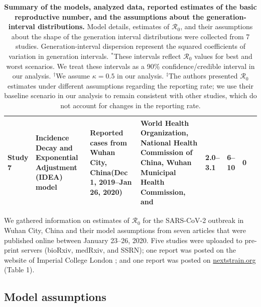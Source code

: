 \documentclass[12pt]{article}
\newcommand{\Ro}{\ensuremath{{\mathcal R}_{0}}\xspace}
\providecommand{\DIFaddend}{} %
\DeclareRobustCommand{\DIFaddend}{\DIFOaddend \let\includegraphics\DIFOincludegraphics} %
\begin{document}
{\begin{landscape}
\begin{table}[!th]
\begin{center}
\begin{tabular}{l|L{2cm}|L{3.2cm}|L{2.8cm}|L{2.5cm}|L{2.4cm}|L{2.7cm}|L{2cm}}
\hline
Study 7 & Incidence Decay and Exponential Adjustment (IDEA) model & Reported cases from Wuhan City, China\newline (Dec 1, 2019--Jan 26, 2020) & World	Health Organization, National Health Commission of China, Wuhan Municipal	Health Commission, and \cite{huang2020clinical} & 2.0--3.1 & 6--10 & 0 & \cite{majumderncov} \\
\hline
\end{tabular}
\end{center}
\caption{
\textbf{Summary of the models, analyzed data, reported estimates of the basic reproductive number, and the assumptions about the generation-interval distributions.}
Model details, estimates of \Ro, and their assumptions about the shape of the generation interval distributions were collected from 7 studies.
Generation-interval dispersion represent the squared coefficients of variation in generation intervals.
$^\ast$These intervals reflect \Ro values for best and worst scenarios. We treat these intervals as a 90\% confidence/credible interval in our analysis.
$^\dagger$We assume $\kappa = 0.5$ in our analysis.
$^\ddagger$The authors presented \Ro estimates under different assumptions regarding the reporting rate; we use their baseline scenario in our analysis to remain consistent with other studies, which do not account for changes in the reporting rate.
}
\end{table}
\end{landscape}
\clearpage
}
\DIFaddend 

We gathered information on estimates of \Ro for the SARS-CoV-2 outbreak in Wuhan City, China and their model assumptions from seven articles that were published online between January 23--26, 2020.
Five studies \citep{liuncov, majumderncov, readncov, riouncov, zhaoncov} were uploaded to pre-print servers (bioRxiv, medRxiv, and SSRN); one report was posted on the website of Imperial College London \citep{imaincov}; and one report was posted on \url{nextstrain.org} \citep{bedfordncov} (Table 1).

\subsection{Model assumptions}
\end{document}
